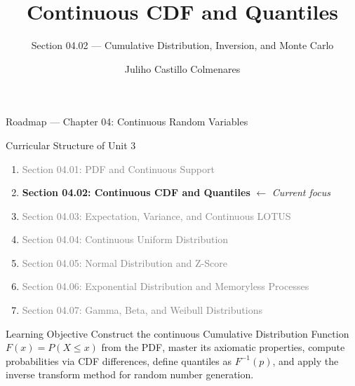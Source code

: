\documentclass[aspectratio=169,xcolor={dvipsnames,table}]{beamer}
\title{Continuous CDF and Quantiles}
\subtitle{Section 04.02 --- Cumulative Distribution, Inversion, and Monte Carlo}
\author[J. Castillo Colmenares]{Juliho Castillo Colmenares}
\institute[Tec de Monterrey]{Tecnologico de Monterrey}
\date{\vspace{-1.5cm}}
\begin{document}
\begin{frame}[plain]
	\titlepage
\end{frame}

\begin{frame}{Roadmap --- Chapter 04: Continuous Random Variables}
	\vspace{-0.15cm}
	\begin{block}{Curricular Structure of Unit 3}
		\footnotesize
		\begin{enumerate}\itemsep=0.03cm
			\item \textcolor{gray}{Section 04.01: PDF and Continuous Support}
			\item \textbf{\textcolor{TecRojo}{Section 04.02: Continuous CDF and Quantiles}} $\leftarrow$ \emph{Current focus}
			\item \textcolor{gray}{Section 04.03: Expectation, Variance, and Continuous LOTUS}
			\item \textcolor{gray}{Section 04.04: Continuous Uniform Distribution}
			\item \textcolor{gray}{Section 04.05: Normal Distribution and Z-Score}
			\item \textcolor{gray}{Section 04.06: Exponential Distribution and Memoryless Processes}
			\item \textcolor{gray}{Section 04.07: Gamma, Beta, and Weibull Distributions}
		\end{enumerate}
	\end{block}
	\vspace{-0.2cm}
	\begin{alertblock}{Learning Objective}
		\scriptsize
		Construct the continuous Cumulative Distribution Function $F(x) = P(X \le x)$ from the PDF, master its axiomatic properties, compute probabilities via CDF differences, define quantiles as $F^{-1}(p)$, and apply the inverse transform method for random number generation.
	\end{alertblock}
\end{frame}
\end{document}
